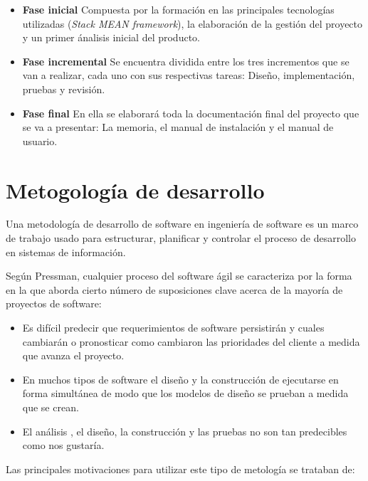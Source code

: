 \begin{itemize}[label={}]
\item \textbf{Fase inicial}
Compuesta por la formación en las principales tecnologías utilizadas (\textit{Stack MEAN framework}), la elaboración de la gestión del proyecto y un primer ánalisis inicial del producto.
\item \textbf{Fase incremental}
Se encuentra dividida entre los tres incrementos que se van a realizar, cada uno con sus respectivas tareas: Diseño, implementación, pruebas y revisión.
\item \textbf{Fase final}
En ella se elaborará toda la documentación final del proyecto que se va a presentar: La memoria, el manual de instalación y el manual de usuario.
\end{itemize} 


\section{Metogología de desarrollo}
Una metodología de desarrollo de software en ingeniería de software es un marco de trabajo usado para estructurar, planificar y controlar el proceso de desarrollo en sistemas de información.


Según Pressman\cite{pressman}, cualquier proceso del software ágil se caracteriza por la forma en la que aborda cierto número de suposiciones clave acerca de la mayoría de proyectos de software:

\begin{itemize}
\item Es difícil predecir que requerimientos de software persistirán y cuales cambiarán o pronosticar como cambiaron las prioridades del cliente a medida que avanza el proyecto.
\item En muchos tipos de software el diseño y la construcción de ejecutarse en forma simultánea de modo que los modelos de diseño se prueban a medida que se crean.
\item El análisis , el diseño, la construcción y las pruebas no son tan predecibles como nos gustaría.
\end{itemize} 


Las principales motivaciones para utilizar este tipo de metología se trataban de:

